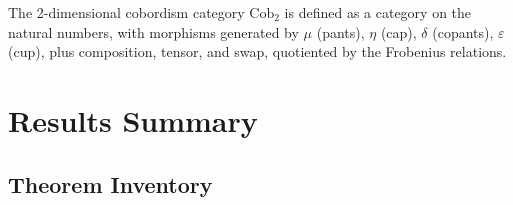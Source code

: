 \documentclass[11pt]{amsart}
\theoremstyle{plain}
\theoremstyle{definition}
\begin{document}
The 2-dimensional cobordism category $\mathrm{Cob}_2$ is defined as a category on the natural numbers, with morphisms generated by $\mu$ (pants), $\eta$ (cap), $\delta$ (copants), $\varepsilon$ (cup), plus composition, tensor, and swap, quotiented by the Frobenius relations.

\section{Results Summary}
\label{sec:results}

\subsection{Theorem Inventory}
\end{document}
